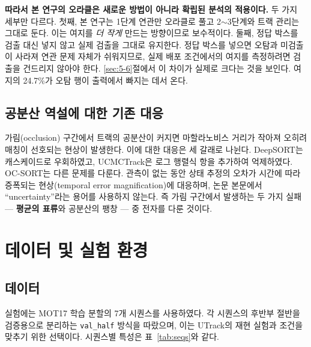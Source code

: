 \documentclass[12pt,a4paper,oneside]{report}
\begin{document}
\textbf{따라서 본 연구의 오라클은 새로운 방법이 아니라 확립된 분석의 적용이다.} 두 가지 세부만 다르다. 첫째, 본 연구는 1단계 연관만 오라클로 풀고 2$\sim$3단계와 트랙 관리는 그대로 둔다. 이는 여지를 \textit{더 작게} 만드는 방향이므로 보수적이다. 둘째, 정답 박스를 검출 대신 넣지 않고 실제 검출을 그대로 유지한다. 정답 박스를 넣으면 오탐과 미검출이 사라져 연관 문제 자체가 쉬워지므로, 실제 배포 조건에서의 여지를 측정하려면 검출을 건드리지 않아야 한다. \ref{sec:5-6}절에서 이 차이가 실제로 크다는 것을 보인다. 여지의 24.7\%가 오탐 행이 출력에서 빠지는 데서 온다.

\section{공분산 역설에 대한 기존 대응}\label{sec:2-5}

가림(occlusion) 구간에서 트랙의 공분산이 커지면 마할라노비스 거리가 작아져 오히려 매칭이 선호되는 현상이 발생한다. 이에 대한 대응은 세 갈래로 나뉜다. DeepSORT는 캐스케이드로 우회하였고, UCMCTrack은 로그 행렬식 항을 추가하여 억제하였다. OC-SORT\citep{cao2023}는 다른 문제를 다룬다. 관측이 없는 동안 상태 추정의 오차가 시간에 따라 증폭되는 현상(temporal error magnification)에 대응하며, 논문 본문에서 ``uncertainty''라는 용어를 사용하지 않는다. 즉 가림 구간에서 발생하는 두 가지 실패 --- \textbf{평균의 표류}와 공분산의 팽창 --- 중 전자를 다룬 것이다.

\chapter{데이터 및 실험 환경}

\section{데이터}\label{sec:3-1}

실험에는 MOT17\citep{milan2016} 학습 분할의 7개 시퀀스를 사용하였다. 각 시퀀스의 후반부 절반을 검증용으로 분리하는 \texttt{val\_half} 방식을 따랐으며, 이는 UTrack의 재현 실험과 조건을 맞추기 위한 선택이다. 시퀀스별 특성은 표~\ref{tab:seqs}와 같다.
\end{document}
